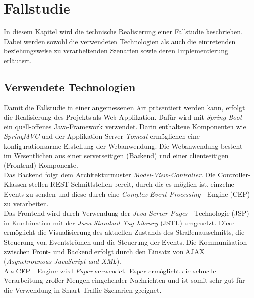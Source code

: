 \section{Fallstudie}
In diesem Kapitel wird die technische Realisierung einer Fallstudie beschrieben. Dabei werden sowohl die verwendeten Technologien als auch die eintretenden beziehungsweise zu verarbeitenden Szenarien sowie deren Implementierung erläutert.

\subsection{Verwendete Technologien}
Damit die Fallstudie in einer angemessenen Art präsentiert werden kann, erfolgt die Realisierung des Projekts als Web-Applikation. Dafür wird mit \textit{Spring-Boot} ein quell-offenes Java-Framework verwendet. Darin enthaltene Komponenten wie \textit{SpringMVC} und der Applikation-Server \textit{Tomcat} ermöglichen eine konfigurationsarme Erstellung der Webanwendung. Die Webanwendung besteht im Wesentlichen aus einer serverseitigen (Backend) und einer clientseitigen (Frontend) Komponente.\\
Das Backend folgt dem Architekturmuster \textit{Model-View-Controller}. Die Controller-Klassen stellen REST-Schnittstellen bereit, durch die es möglich ist, einzelne Events zu senden und diese durch eine \textit{Complex Event Processing} - Engine (CEP) zu verarbeiten.\\
Das Frontend wird durch Verwendung der \textit{Java Server Pages} - Technologie (JSP) in Kombination mit der \textit{Java Standard Tag Library} (JSTL) umgesetzt. Diese ermöglicht die Visualisierung des aktuellen Zustands des Straßenausschnitts, die Steuerung von Eventströmen und die Steuerung der Events. Die Kommunikation zwischen Front- und Backend erfolgt durch den Einsatz von AJAX (\textit{Asynchrounous JavaScript and XML}).\\
Als CEP - Engine wird \textit{Esper} verwendet. Esper ermöglicht die schnelle Verarbeitung großer Mengen eingehender Nachrichten und ist somit sehr gut für die Verwendung in Smart Traffic Szenarien geeignet. 


